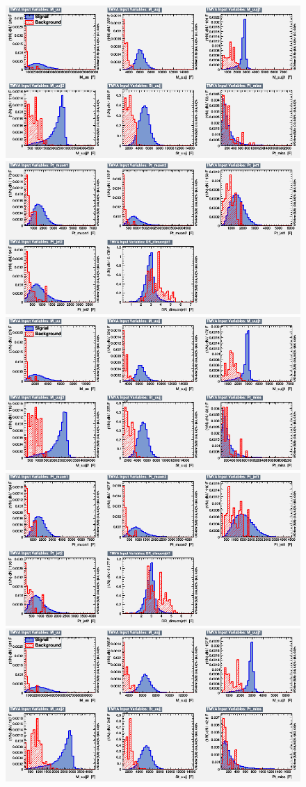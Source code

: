 \begin{figure}[H]
    \centering
    {\includegraphics[width=.49\textwidth]{Images/Analysis/Results_LQToBMu_pair_uubj_BDTG_FullRun2_2023_01_25_020318/2800/variables_id_c1.png}}
    {\includegraphics[width=.49\textwidth]{Images/Analysis/Results_LQToBMu_pair_uubj_BDTG_FullRun2_2023_01_25_020318/2800/variables_id_c2.png}}
    {\includegraphics[width=.49\textwidth]{Images/Analysis/Results_LQToBMu_pair_uubj_BDTG_FullRun2_2023_01_25_020318/2900/variables_id_c1.png}}
    {\includegraphics[width=.49\textwidth]{Images/Analysis/Results_LQToBMu_pair_uubj_BDTG_FullRun2_2023_01_25_020318/2900/variables_id_c2.png}}
    {\includegraphics[width=.49\textwidth]{Images/Analysis/Results_LQToBMu_pair_uubj_BDTG_FullRun2_2023_01_25_020318/3000/variables_id_c1.png}}

\end{figure}
